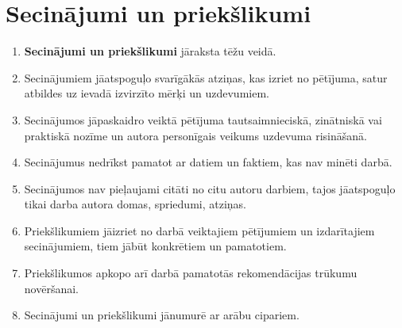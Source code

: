 \chapter*{Secinājumi un priekšlikumi}
\begin{enumerate}
\item \textbf{Secinājumi un priekšlikumi} jāraksta tēžu veidā.
\item Secinājumiem jāatspoguļo svarīgākās atziņas, kas izriet no pētījuma, satur atbildes uz ievadā izvirzīto mērķi un uzdevumiem.
\item Secinājumos jāpaskaidro veiktā pētījuma tautsaimnieciskā, zinātniskā vai praktiskā nozīme un autora personīgais veikums uzdevuma risināšanā.
\item Secinājumus nedrīkst pamatot ar datiem un faktiem, kas nav minēti darbā.
\item Secinājumos nav pieļaujami citāti no citu autoru darbiem, tajos jāatspoguļo tikai darba autora domas, spriedumi, atziņas.
\item Priekšlikumiem jāizriet no darbā veiktajiem pētījumiem un izdarītajiem secinājumiem, tiem jābūt konkrētiem un pamatotiem.
\item Priekšlikumos apkopo arī darbā pamatotās rekomendācijas trūkumu novēršanai.
\item Secinājumi un priekšlikumi jānumurē ar arābu cipariem.
\end{enumerate}
